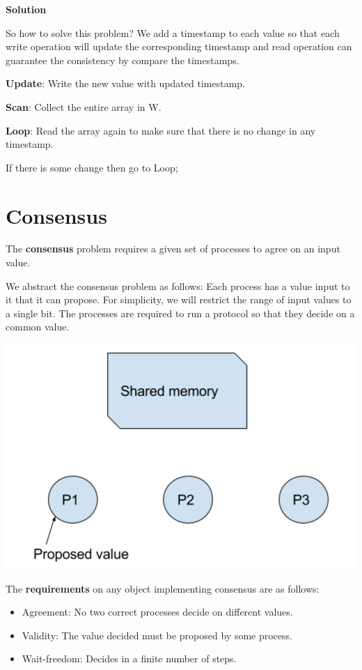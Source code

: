 \documentclass[twoside]{article}
\begin{document}
\textbf{Solution}

So how to solve this problem? We add a timestamp to each value so that each write operation will update the corresponding timestamp and read operation can guarantee the consistency by compare the timestamps.

\textbf{Update}:
	Write the new value with updated timestamp.
	
\textbf{Scan}:
	Collect the entire array in W.
	
\textbf{Loop}:   
    Read the array again to make sure that there is no change in any timestamp.
    
If there is some change then go to Loop;

\section{Consensus}
The \textbf{consensus} problem requires a given set of processes to agree on an input value.

We abstract the consensus problem as follows: Each process has a value input to it that it can propose. For simplicity, we will restrict the range of input values to a single bit. The processes are required to run a protocol so that they decide on a common value.

\includegraphics{consensus.png}

The \textbf{requirements} on any object implementing consensus are as follows:

\begin{itemize}
    \item Agreement:  No two correct processes decide on different values.
    \item Validity: The value decided must be proposed by some process.
    \item Wait-freedom: Decides in a finite number of steps.
\end{itemize}
\end{document}
